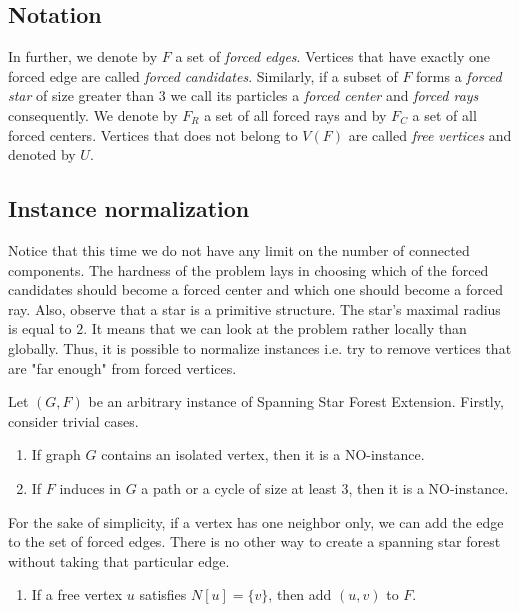 \documentclass[en]{pracamgr}
\newcommand{\ssfep}{{\sc Spanning Star Forest Extension}}
\begin{document}
\subsection{Notation}

In further, we denote by $F$ a set of \emph{forced edges}. Vertices that have exactly one forced edge are called \emph{forced candidates}. Similarly, if a subset of $F$ forms a \emph{forced star} of size greater than $3$ we call its particles a \emph{forced center} and \emph{forced rays} consequently. We denote by $F_R$ a set of all forced rays and by $F_C$ a set of all forced centers. Vertices that does not belong to $V(F)$ are called \emph{free vertices} and denoted by $U$.

\subsection{Instance normalization} 

Notice that this time we do not have any limit on the number of connected components. The hardness of the problem lays in choosing which of the forced candidates should become a forced center and which one should become a forced ray. Also, observe that a star is a primitive structure. The star's maximal radius is equal to $2$. It means that we can look at the problem rather locally than globally. Thus, it is possible to normalize instances i.e. try to remove vertices that are "far enough" from forced vertices.

Let $(G, F)$ be an arbitrary instance of \ssfep{}. Firstly, consider trivial cases.

\begin{enumerate}[leftmargin=*,label=\textbf{Reduction \arabic{enumi}},labelindent=0pt]
	\item If graph $G$ contains an isolated vertex, then it is a NO-instance.
	\item If $F$ induces in $G$ a path or a cycle of size at least $3$, then it is a NO-instance.
\end{enumerate}

For the sake of simplicity, if a vertex has one neighbor only, we can add the edge to the set of forced edges. There is no other way to create a spanning star forest without taking that particular edge.

\begin{enumerate}[leftmargin=*,label=\textbf{Reduction \arabic{enumi}},resume]
	\item If a free vertex $u$ satisfies $N[u] = \{v\}$, then add $(u,v)$ to $F$.
\end{enumerate}
\end{document}
